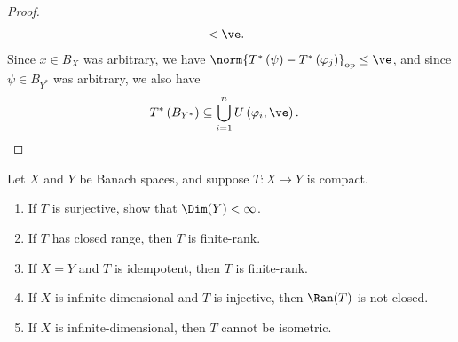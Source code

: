 \documentclass[10pt]{mypackage}
\begin{document}
\begin{proof}
\begin{align*}
                                                                                                    &< \ve.
  \end{align*}
  Since $x\in B_X$ was arbitrary, we have $\norm{T^{\ast}\left(\psi\right) - T^{\ast}\left(\varphi_{j}\right)}_{\text{op}}\leq \ve$, and since $\psi\in B_{Y^{\ast}}$ was arbitrary, we also have
  \begin{align*}
    T^{\ast}\left(B_{Y^{\ast}}\right) &\subseteq \bigcup_{i=1}^{n}U\left(\varphi_{i},\ve\right).
  \end{align*}
\end{proof}
\begin{exercise}
  Let $X$ and $Y$ be Banach spaces, and suppose $T:X\rightarrow Y$ is compact.
  \begin{enumerate}[(1)]
    \item If $T$ is surjective, show that $\Dim(Y) < \infty$.
    \item If $T$ has closed range, then $T$ is finite-rank.
    \item If $X=Y$ and $T$ is idempotent, then $T$ is finite-rank.
    \item If $X$ is infinite-dimensional and $T$ is injective, then $\Ran(T)$ is not closed.
    \item If $X$ is infinite-dimensional, then $T$ cannot be isometric.
  \end{enumerate}
\end{exercise}
\end{document}

